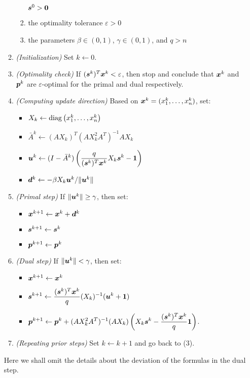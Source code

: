 \begin{enumerate}
\begin{enumerate}[label={(\arabic*)}]
\begin{enumerate}
\(\bm{s}^{0}>\bm{0}\)
\item the optimality tolerance \(\varepsilon>0\)
\item the parameters \(\beta\in (0,1)\), \(\gamma\in (0,1)\), and \(q>n\)
\end{enumerate}
\item \emph{(Initialization)} Set \(k\leftarrow 0\).
\item \emph{(Optimality check)} If
\((\bm{s}^{k})^{T}\bm{x}^{k}<\varepsilon\), then stop and conclude that
\(\bm{x}^{k}\) and \(\bm{p}^{k}\) are \(\varepsilon\)-optimal for the
primal and dual respectively.
\item \emph{(Computing update direction)} Based on
\(\bm{x}^{k}=(x_1^{k},\dotsc,x_n^{k})\), set:
\begin{itemize}
\item \(X_k\leftarrow\operatorname{diag}\left(x_1^{k},\dotsc,x_n^{k}\right)\)
\item \(\bar{A}^{k}\leftarrow (AX_k)^{T}(AX_k^{2}A^{T})^{-1}AX_k\)
\item \(\displaystyle \bm{u}^{k}\leftarrow (I-\bar{A}^{k})\left(\frac{q}
{(\bm{s}^{k})^{T}\bm{x}^{k}}X_k\bm{s}^{k}-\bm{1}\right)\)
\item \(\bm{d}^{k}\leftarrow -\beta X_k\bm{u}^{k}/\|\bm{u}^{k}\|\)
\end{itemize}
\item \emph{(Primal step)} If \(\|\bm{u}^{k}\|\ge\gamma\), then set:
\begin{itemize}
\item \(\bm{x}^{k+1}\leftarrow \bm{x}^{k}+\bm{d}^{k}\)
\item \(\bm{s}^{k+1}\leftarrow \bm{s}^{k}\)
\item \(\bm{p}^{k+1}\leftarrow \bm{p}^{k}\)
\end{itemize}
\item \emph{(Dual step)} If \(\|\bm{u}^{k}\|<\gamma\), then set:
\begin{itemize}
\item \(\bm{x}^{k+1}\leftarrow \bm{x}^{k}\)
\item \(\displaystyle \bm{s}^{k+1}\leftarrow
\frac{(\bm{s}^{k})^{T}\bm{x}^{k}}{q}(X_k)^{-1}(\bm{u}^{k}+\bm{1})\)
\item \(\displaystyle \bm{p}^{k+1}\leftarrow \bm{p}^{k}
+(AX_k^{2}A^{T})^{-1}(AX_{k})
\left(X_k\bm{s}^{k}-\frac{(\bm{s}^{k})^{T}\bm{x}^{k}}{q}\bm{1}\right)\).
\end{itemize}
\item \emph{(Repeating prior steps)} Set \(k\leftarrow k+1\) and go back to (3).
\end{enumerate}
\begin{note}
Here we shall omit the details about the deviation of the formulas in the dual
step.
\end{note}
\end{enumerate}
